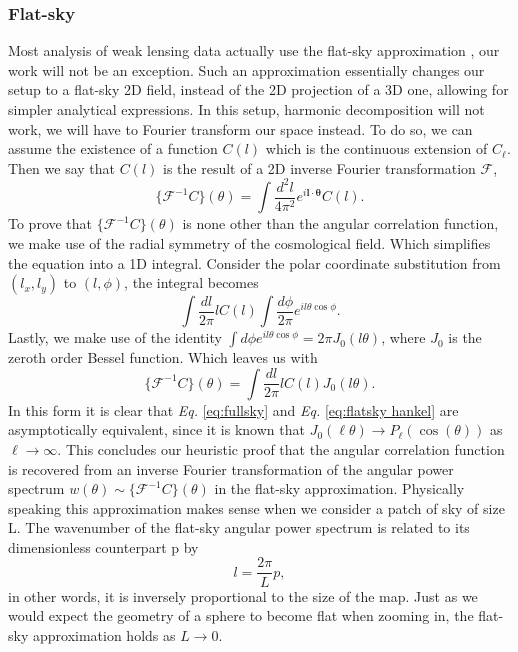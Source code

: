 \subsubsection{Flat-sky}
Most analysis of weak lensing data actually use the flat-sky approximation \cite{flatsky} \cite{flatsky2} \cite{flatsky3} \cite{flatsky4} \cite{flatsky5} \cite{flatsky6}, our work will not be an exception. Such an approximation essentially changes our setup to a flat-sky 2D field, instead of the 2D projection of a 3D one, allowing for simpler analytical expressions. In this setup, harmonic decomposition will not work, we will have to Fourier transform our space instead. To do so, we can assume the existence of a function $C(l)$ which is the continuous extension of $C_\ell$. Then we say that $C(l)$ is the result of a 2D inverse Fourier transformation $\mathcal{F}$,
\begin{equation}
    \{\mathcal{F}^{-1}C\}(\theta)=\int\frac{d^2l}{4\pi^2}e^{i\bm{l}\cdot\bm{\theta}}C(l).
    \label{eq:flatsky fft}
\end{equation}
To prove that $\{\mathcal{F}^{-1}C\}(\theta)$ is none other than the angular correlation function, we make use of the radial symmetry of the cosmological field. Which simplifies the equation into a 1D integral. Consider the polar coordinate substitution from $(l_x,l_y)$ to $(l,\phi)$, the integral becomes
\begin{equation*}
    \int \frac{dl}{2\pi} l C(l) \int\frac{d\phi}{2\pi}e^{il\theta \cos{\phi}}.
\end{equation*}
Lastly, we make use of the identity $\int d\phi e^{il\theta \cos{\phi}} = 2\pi J_0(l\theta)$, where $J_0$ is the zeroth order Bessel function. Which leaves us with
\begin{equation}
    \{\mathcal{F}^{-1}C\}(\theta) = \int \frac{dl}{2\pi} l C(l) J_0(l\theta).
    \label{eq:flatsky hankel}
\end{equation}
In this form it is clear that \textit{Eq. }\eqref{eq:fullsky} and \textit{Eq. }\eqref{eq:flatsky hankel} are asymptotically equivalent, since it is known that $J_0(\ell\theta) \xrightarrow{\quad} P_\ell (\cos(\theta))$ as $\ell \rightarrow \infty$. This concludes our heuristic proof that the angular correlation function is recovered from an inverse Fourier transformation of the angular power spectrum $w(\theta) \sim \{\mathcal{F}^{-1}C\}(\theta)$ in the flat-sky approximation. Physically speaking this approximation makes sense when we consider a patch of sky of size L. The wavenumber of the flat-sky angular power spectrum is related to its dimensionless counterpart p by 
\begin{equation}
    l = \frac{2\pi}{L}p,
    \label{eq:ell px}
\end{equation}
in other words, it is inversely proportional to the size of the map. Just as we would expect the geometry of a sphere to become flat when zooming in, the flat-sky approximation holds as $L \rightarrow 0$. 


